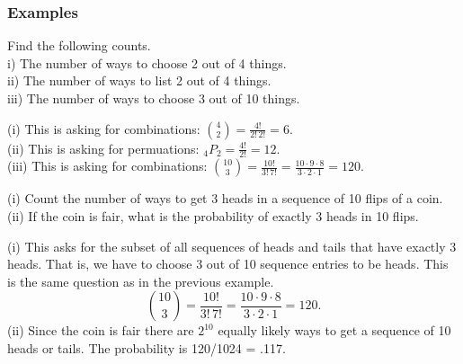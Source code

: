 \subsubsection{Examples}
\numexamp Find the following counts.\\
i) The number of ways to choose 2 out of 4 things.\\
ii) The number of ways to list 2 out of 4 things.\\
iii) The number of ways to choose 3 out of 10 things.

\ans (i) This is asking for combinations: $\binom{4}{2} = \frac{4!}{2!\,2!} = 6$.\\
(ii) This is asking for permuations: $_4P_2 = \frac{4!}{2!} = 12$.\\
(iii) This is asking for combinations: 
$\binom{10}{3} = \frac{10!}{3!\,7!} = \frac{10\cdot9\cdot8}{3\cdot2\cdot1} = 120.
$

\medskip

\numexamp 
(i) Count the number of ways to get 3 heads in a sequence of 
10 flips of a coin.\\
(ii) If the coin is fair, what is the probability of exactly 3 heads in 10 flips.

\ans (i) This asks for the subset of all sequences of heads and tails
that have exactly 3 heads. That is, we have to
choose 3 out of 10 sequence entries to be heads. 
This is the same question as in the previous
example.
\[
\binom{10}{3} = \frac{10!}{3!\,7!} = \frac{10\cdot9\cdot8}{3\cdot2\cdot1} = 120.
\]
(ii) Since the coin is fair there are $2^{10}$ equally likely ways to 
get a sequence of 10 heads or tails. The probability is 120/1024 = .117.





